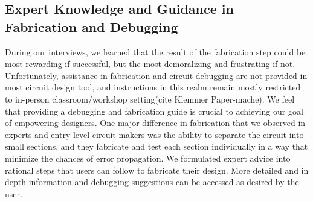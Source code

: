 \documentclass{sigchi}
\begin{document}
\subsection{Expert Knowledge and Guidance in Fabrication and Debugging}
During our interviews, we learned that the result of the fabrication step could be most rewarding if successful, but the most demoralizing and frustrating if not. Unfortunately, assistance in fabrication and circuit debugging are not provided in most circuit design tool, and instructions in this realm remain mostly restricted to in-person classroom/workshop setting(cite Klemmer Paper-mache). We feel that providing a debugging and fabrication guide is crucial to achieving our goal of empowering designers. One major difference in fabrication that we observed in experts and entry level circuit makers was the ability to separate the circuit into small sections, and they fabricate and test each section individually in a way that minimize the chances of error propagation. We formulated expert advice into rational steps that users can follow to fabricate their design. More detailed and in depth information and debugging suggestions can be accessed as desired by the user.  





\end{document}

